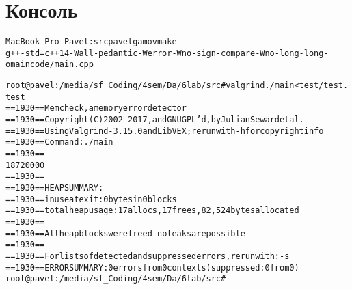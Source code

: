 \pagebreak

\section{Консоль}

\begin{alltt}
MacBook-Pro-Pavel:src pavelgamov make
g++ -std=c++14 -Wall -pedantic -Werror -Wno-sign-compare -Wno-long-long -o main code/main.cpp

root@pavel:/media/sf_Coding/4sem/Da/6lab/src# valgrind ./main < test/test.test 
==1930== Memcheck, a memory error detector
==1930== Copyright (C) 2002-2017, and GNU GPL'd, by Julian Seward et al.
==1930== Using Valgrind-3.15.0 and LibVEX; rerun with -h for copyright info
==1930== Command: ./main
==1930== 
18720000
==1930== 
==1930== HEAP SUMMARY:
==1930==     in use at exit: 0 bytes in 0 blocks
==1930==   total heap usage: 17 allocs, 17 frees, 82,524 bytes allocated
==1930== 
==1930== All heap blocks were freed -- no leaks are possible
==1930== 
==1930== For lists of detected and suppressed errors, rerun with: -s
==1930== ERROR SUMMARY: 0 errors from 0 contexts (suppressed: 0 from 0)
root@pavel:/media/sf_Coding/4sem/Da/6lab/src# 

\end{alltt}

\pagebreak